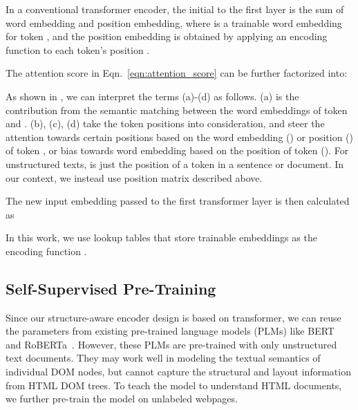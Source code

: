 \documentclass[sigconf, nonacm]{acmart}
\newcommand{\nop}[1]{}
\begin{document}
In a conventional transformer encoder, the initial  to the first layer is the sum of word embedding and position embedding, where  is a trainable word embedding for token , and the position embedding is obtained by applying an encoding function  to each token's position . 

The attention score  in Eqn.~\ref{eqn:attention_score} can be further factorized into:

As shown in \citet{zuegner_code_transformer_2021}, we can interpret the terms (a)-(d) as follows. (a)  is the contribution from the semantic matching between the word embeddings of token  and . (b), (c), (d) take the token positions into consideration, and steer the attention towards certain positions based on the word embedding () or position () of token , or bias towards word embedding based on the position of token  (). For unstructured texts,  is just the position of a token in a sentence or document. In our context, we instead use position matrix described above.

\nop{I think the paragraphs above are all talking about the internals of BERT, right from Sec 4.2.2, which is not part of our contribution. So, the reader may be left wondering why she is shown all the details until they arrive at the following paragraph, which is brief. So, I suggest starting with a brief introduction of key parts of BERT and motivating what and why you plan to replace with novel components that are suited for the HTML setting. Provide intuition before introducing the concept.}



The new input embedding  passed to the first transformer layer is then calculated as

In this work, we use lookup tables that store trainable embeddings as the encoding function .


\subsection{Self-Supervised Pre-Training}

Since our structure-aware encoder design is based on transformer, we can reuse the parameters from existing pre-trained language models (PLMs) like BERT~\cite{devlin-etal-2019-bert} and RoBERTa~\cite{liu2019roberta}. However, these PLMs are pre-trained with only unstructured text documents. They may work well in modeling the textual semantics of individual DOM nodes, but cannot capture the structural and layout information from HTML DOM trees. To teach the model to understand HTML documents, we further pre-train the model on unlabeled webpages. 
\end{document}

